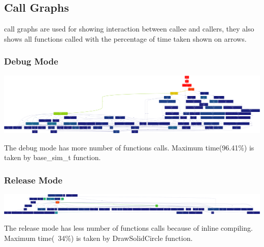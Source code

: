 \documentclass[11pt]{article}
\begin{document}
\subsection{Call Graphs}
call graphs are used for showing interaction between callee and callers, they also shows all functions called with the percentage of time taken shown on arrows.
\subsubsection{Debug Mode}
\begin{center}
\includegraphics[scale=0.06]{call_graph_debug}
\end{center}
The debug mode has more number of functions calls. Maximum time(96.41\%) is taken by base\_sim\_t function.
\subsubsection{Release Mode}
\begin{center}
\includegraphics[scale=0.06]{call_graph_release}
\end{center}
The release mode has less number of functions calls because of inline compiling. Maximum time(~34\%) is taken by DrawSolidCircle function.
\end{document}
